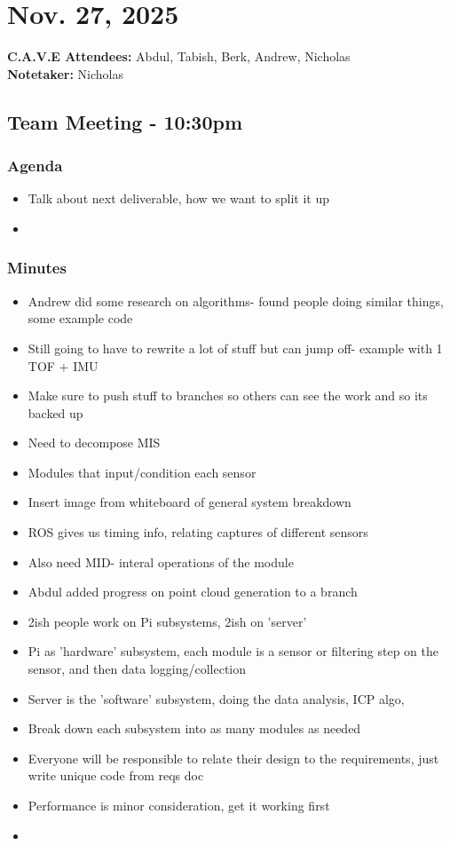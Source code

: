 	\pagebreak
	\section*{Nov. 27, 2025}

	\textbf{C.A.V.E Attendees:} Abdul, Tabish, Berk, Andrew, Nicholas\\
	\textbf{Notetaker:} Nicholas

	\subsection*{Team Meeting - 10:30pm}
		\subsubsection*{Agenda}
			\begin{itemize}
				\item Talk about next deliverable, how we want to split it up
				\item 
			\end{itemize}

		\subsubsection*{Minutes}
			\begin{itemize}
				\item Andrew did some research on algorithms- found people doing similar things, some example code
				\item Still going to have to rewrite a lot of stuff but can jump off- example with 1 TOF + IMU
				\item Make sure to push stuff to branches so others can see the work and so its backed up
				\item Need to decompose MIS
				\item Modules that input/condition each sensor 
				\item Insert image from whiteboard of general system breakdown
				\item ROS gives us timing info, relating captures of different sensors
				\item Also need MID- interal operations of the module
				\item Abdul added progress on point cloud generation to a branch
				\item 2ish people work on Pi subsystems, 2ish on 'server'
				\item Pi as 'hardware' subsystem, each module is a sensor or filtering step on the sensor, and then data logging/collection
				\item Server is the 'software' subsystem, doing the data analysis, ICP algo, 
				\item Break down each subsystem into as many modules as needed
				\item Everyone will be responsible to relate their design to the requirements, just write unique code from reqs doc 
				\item Performance is minor consideration, get it working first
				\item 
			\end{itemize}


